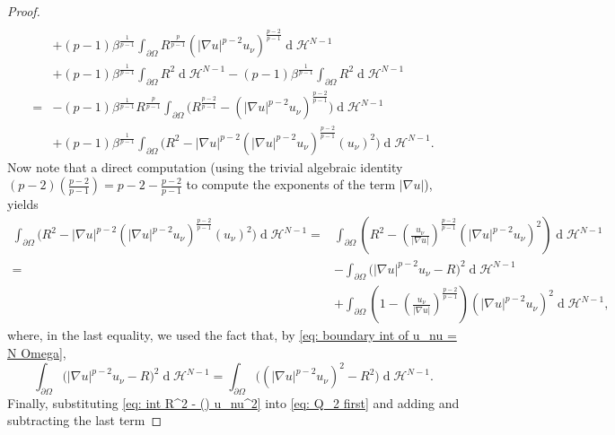 \documentclass[10pt,a4paper, reqno]{amsart}
\numberwithin{equation}{section}
\renewcommand{\d}[1]{\ensuremath{\operatorname{d}\!{#1}}}
\begin{document}
\begin{proof}
\begin{equation}
\begin{split}
    \\
    & + (p-1) \beta^{\frac{1}{p-1}} \int_{\partial\Omega} R^{\frac{p}{p-1}} (|\nabla u|^{p-2} u_\nu)^{\frac{p-2}{p-1}} \d{}\mathcal{H}^{N-1}
    \\
    &  + (p-1) \beta^{\frac{1}{p-1}} \int_{\partial\Omega} R^2 \d{}\mathcal{H}^{N-1} - (p-1) \beta^{\frac{1}{p-1}} \int_{\partial\Omega} R^2 \d{}\mathcal{H}^{N-1} 
    \\
     = & - (p-1) \beta^{\frac{1}{p-1}} R^{\frac{p}{p-1}} \int_{\partial\Omega} \Big( R^{\frac{p-2}{p-1}} - (|\nabla u|^{p-2} u_\nu)^{\frac{p-2}{p-1}} \Big) \d{}\mathcal{H}^{N-1} 
    \\
    &  + (p-1) \beta^{\frac{1}{p-1}} \int_{\partial\Omega} \Big( R^2 - |\nabla u|^{p-2} (|\nabla u|^{p-2} u_\nu)^{\frac{p-2}{p-1}} (u_\nu)^2 \Big) \d{}\mathcal{H}^{N-1}. 
    \end{split}
    \end{equation}
    Now note that a direct computation (using the trivial algebraic identity $(p-2)\left( \frac{p-2}{p-1}\right) = p-2 - \frac{p-2}{p-1} $ to compute the exponents of the term $|\nabla u|$), yields
    \begin{equation}\label{eq: int R^2 - () u_nu^2}
    \begin{split}
        \int_{\partial\Omega} \Big( R^2 - |\nabla u|^{p-2} (|\nabla u|^{p-2} u_\nu)^{\frac{p-2}{p-1}} (u_\nu)^2 \Big) \d{}\mathcal{H}^{N-1} =& \int_{\partial\Omega} \left( R^2 - \left(\frac{u_\nu}{|\nabla u|}\right)^{\frac{p-2}{p-1}} (|\nabla u|^{p-2} u_\nu)^2 \right) \d{}\mathcal{H}^{N-1} 
        \\
        = & - \int_{\partial\Omega} \Big(|\nabla u|^{p-2} u_\nu - R \Big)^2  \d{}\mathcal{H}^{N-1} 
        \\
        &+
        \int_{\partial\Omega} \left(1- \left(\frac{u_\nu}{|\nabla u|}\right)^{\frac{p-2}{p-1}} \right) (|\nabla u|^{p-2} u_\nu)^2 \d{}\mathcal{H}^{N-1}, 
    \end{split}
    \end{equation}
    where, in the last equality, we used the fact that, by \eqref{eq: boundary int of u_nu = N Omega},
    \begin{equation*}
         \int_{\partial\Omega} \Big(|\nabla u|^{p-2} u_\nu - R \Big)^2  \d{}\mathcal{H}^{N-1} =  \int_{\partial\Omega} \Big( (|\nabla u|^{p-2} u_\nu)^2 - R^2 \Big)  \d{}\mathcal{H}^{N-1}.
    \end{equation*}
    Finally, substituting \eqref{eq: int R^2 - () u_nu^2} into \eqref{eq: Q_2 first} and adding and subtracting the last term 

\end{proof}
\end{document}
